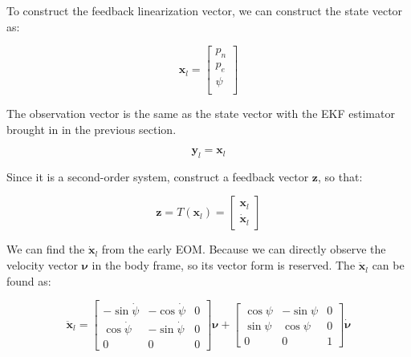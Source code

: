 To construct the feedback linearization vector, we can construct the state vector as:

\begin{equation}
    \boldsymbol{x}_l=\left[\begin{array}{c}
        p_n  \\
        p_e  \\
        \psi \\
    \end{array}\right]
\end{equation}

The observation vector is the same as the state vector with the EKF estimator brought in in the previous section.

\begin{equation}
    \boldsymbol{y}_l=\boldsymbol{x}_l
\end{equation}

Since it is a second-order system, construct a feedback vector $\boldsymbol{z}$, so that:



\begin{equation}
    \boldsymbol{z}=T(\boldsymbol{x}_l)=\left[\begin{array}{c}
        \boldsymbol{x}_l  \\
        \dot{\boldsymbol{x}}_l
    \end{array}\right]
\end{equation}

We can find the $\dot{\boldsymbol{x}}_l$ from the early EOM. Because we can directly observe the velocity vector $\boldsymbol{\nu}$ in the body frame, so its vector form is reserved. The $\ddot{\boldsymbol{x}}_l$ can be found as:

\begin{equation}
    \ddot{\boldsymbol{x}}_l=\left[\begin{array}{ccc}
        -\sin{\dot{\psi}} & -\cos{\dot{\psi}} & 0  \\
        \cos{\dot{\psi}} & -\sin{\dot{\psi}} & 0 \\
        0 & 0 & 0
    \end{array}\right]\boldsymbol{\nu}+\left[\begin{array}{ccc}
        \cos{\psi} & -\sin{\psi} & 0  \\
        \sin{\psi} & \cos{\psi} & 0 \\
        0 & 0 & 1
    \end{array}\right]\dot{\boldsymbol{\nu}}
\end{equation}

